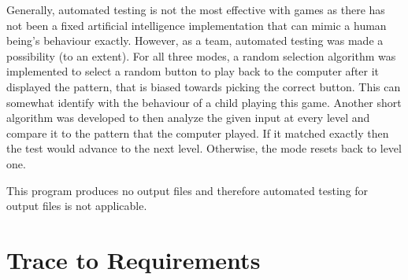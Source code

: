 \documentclass[12pt, titlepage]{article}
\begin{document}
\par Generally, automated testing is not the most effective with games as there has not been a fixed artificial intelligence implementation that can mimic a human being’s behaviour exactly. However, as a team, automated testing was made a possibility (to an extent). For all three modes, a random selection algorithm was implemented to select a random button to play back to the computer after it displayed the pattern, that is biased towards picking the correct button. This can somewhat identify with the behaviour of a child playing this game. Another short algorithm was developed to then analyze the given input at every level and compare it to the pattern that the computer played. If it matched exactly then the test would advance to the next level. Otherwise, the mode resets back to level one.
\\
\par This program produces no output files and therefore automated testing for output files is not applicable.

		
\section{Trace to Requirements}
		
\end{document}

